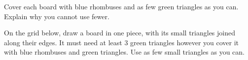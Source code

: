 \documentclass[12pt]{article}
\begin{document}
\vspace{0.15in}

\newpage
{}

\newpage
{} Cover each board with blue rhombuses and as few green triangles as you can. Explain why you cannot use fewer.

\vspace{0.1in}

\newpage
{} On the grid below, draw a board in one piece, with its small triangles joined along their edges. It must need at least 3 green triangles however you cover it with blue rhombuses and green triangles. Use as few small triangles as you can.

\vspace{0.15in}
\end{document}
